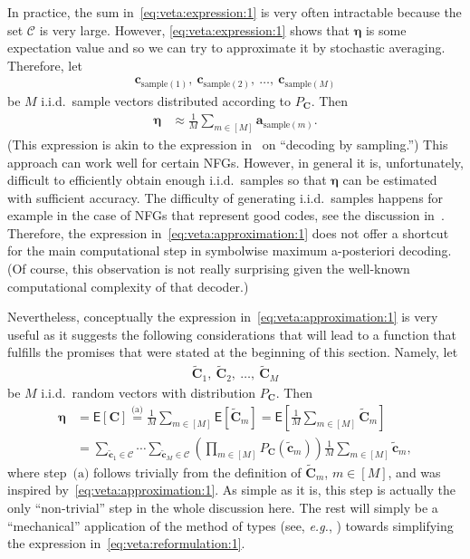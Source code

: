 \documentclass[journal, twocolumn]{IEEEtran}
\renewcommand{\mathbf}[1]{{\bm{#1}}}
\newcommand{\eg}{\emph{e.g.}}
\newcommand{\Expec}{\mathsf{E}}
\newcommand{\vect}[1]{\mathbf{#1}}
\newcommand{\code}[1]{\mathcal{#1}}
\newcommand{\onestareq}{\overset{\text{(a)}}{=}}
\newcommand{\onestar}{\text{(a)}}
\newcommand{\codeCedge}{\code{C}}
\newcommand{\veta}{\boldsymbol{\eta}}
\newcommand{\va}{\vect{a}}
\newcommand{\vC}{\vect{C}}
\newcommand{\vc}{\vect{c}}
\newcommand{\?}{\mathrm{?}}
\newcommand{\tvC}{\vect{\tilde{C}}}
\newcommand{\tvc}{\vect{\tilde{c}}}
\newcommand{\vaoldsample}[1]{\va_{\sample{#1}}}
\newcommand{\vcoldsample}[1]{\vc_{\sample{#1}}}
\newcommand{\vCsample}[1]{\tvC_{#1}}
\newcommand{\vcsample}[1]{\tvc_{#1}}
\newcommand{\sample}[1]{\textrm{sample}(#1)}
\begin{document}
In practice, the sum in~\eqref{eq:veta:expression:1} is very often intractable
because the set $\codeCedge$ is very large. However,
\eqref{eq:veta:expression:1} shows that $\veta$ is some expectation value and
so we can try to approximate it by stochastic averaging. Therefore, let
\begin{align*}
  \vcoldsample{1}, \ \vcoldsample{2}, \ \ldots, \ \vcoldsample{M}
\end{align*}
be $M$ i.i.d.\ sample vectors distributed according to $P_{\vC}$. Then
\begin{align}
  \veta
    &\approx
       \frac{1}{M}
       \sum_{m \in [M]}
         \vaoldsample{m}.
           \label{eq:veta:approximation:1}
\end{align}
(This expression is akin to the expression
in~\cite[Section~13.2]{Mezard:Montanari:09:1} on ``decoding by sampling.'')
This approach can work well for certain NFGs. However, in general it is,
unfortunately, difficult to efficiently obtain enough i.i.d.\ samples so that
$\veta$ can be estimated with sufficient accuracy. The difficulty of
generating i.i.d.\ samples happens for example in the case of NFGs that
represent good codes, see the discussion
in~\cite[Section~13.2]{Mezard:Montanari:09:1}. Therefore, the expression
in~\eqref{eq:veta:approximation:1} does not offer a shortcut for the main
computational step in symbolwise maximum a-posteriori decoding. (Of course,
this observation is not really surprising given the well-known computational
complexity of that decoder.)

Nevertheless, conceptually the expression in~\eqref{eq:veta:approximation:1}
is very useful as it suggests the following considerations that will lead to a
function that fulfills the promises that were stated at the beginning of this
section. Namely, let
\begin{align*}
  \vCsample{1}, \ \vCsample{2}, \ \ldots, \ \vCsample{M}
\end{align*}
be $M$ i.i.d.\ random vectors with distribution $P_{\vC}$. Then
\begin{align}
  \veta
    &= \Expec[\vC]
     \onestareq
       \frac{1}{M}
       \sum_{m \in [M]}
         \Expec[\vCsample{m}]
     = \Expec
         \left[
           \frac{1}{M}
           \sum_{m \in [M]}
             \vCsample{m}
         \right] \nonumber \\
    &= \sum_{\vcsample{1} \in \codeCedge}
       \cdots
       \sum_{\vcsample{M} \in \codeCedge}
         \left(
           \prod_{m \in [M]}
             P_{\vC}(\vcsample{m})
         \right)
         \frac{1}{M}
         \sum_{m \in [M]}
           \vcsample{m},
             \label{eq:veta:reformulation:1}
\end{align}
where step~$\onestar$ follows trivially from the definition of $\vCsample{m}$,
$m \in [M]$, and was inspired by~\eqref{eq:veta:approximation:1}. As simple as
it is, this step is actually the only ``non-trivial'' step in the whole
discussion here. The rest will simply be a ``mechanical'' application of the
method of types (see, \eg, \cite{Csiszar:Korner:81, Cover:Thomas:91}) towards
simplifying the expression in~\eqref{eq:veta:reformulation:1}.
\end{document}
